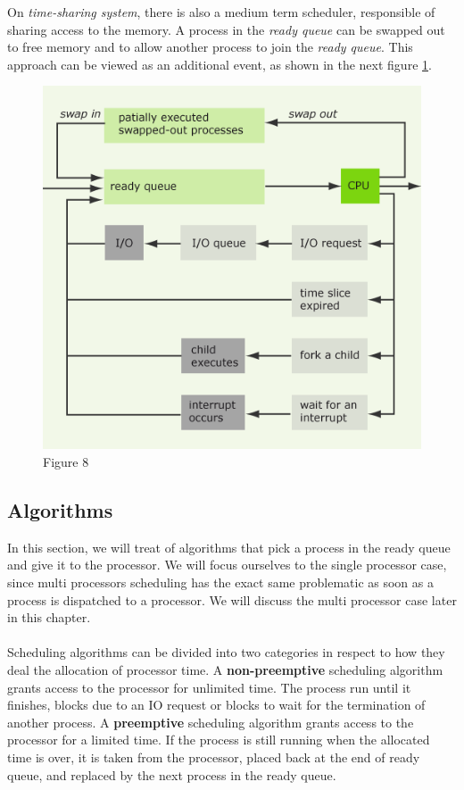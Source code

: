 \documentclass[11pt,a4paper]{scrreprt}
\begin{document}
On \textit{time-sharing system}, there is also a medium term scheduler, responsible of sharing access to the memory. A process in the \textit{ready queue} can be swapped out to free memory and to allow another process to join the \textit{ready queue}. This approach can be viewed as an additional event, as shown in the next figure \ref{fig:figure8}.
\begin{figure}[!ht]
\centering
\includegraphics[width=0.8\linewidth]{img/Fig8.png}
\caption{Figure 8}
\label{fig:figure8}
\end{figure} \newpage

\subsection{Algorithms}
In this section, we will treat of algorithms that pick a process in the ready queue and give it to the processor. We will focus ourselves to the single processor case, since multi processors scheduling has the exact same problematic as soon as a process is dispatched to a processor. We will discuss the multi processor case later in this chapter. \\\\
Scheduling algorithms can be divided into two categories in respect to how they deal the allocation of processor time. A \textbf{non-preemptive} scheduling algorithm grants access to the processor for unlimited time. The process run until it finishes, blocks due to an IO request or blocks to wait for the termination of another process. A \textbf{preemptive} scheduling algorithm grants access to the processor for a limited time. If the process is still running when the allocated time is over, it is taken from the processor, placed back at the end of ready queue, and replaced by the next process in the ready queue.
\newpage
\end{document}
